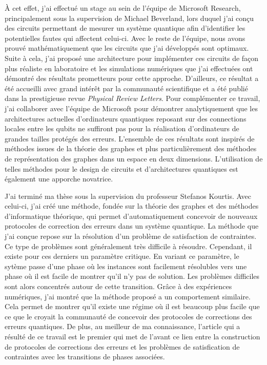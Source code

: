 À cet effet, j'ai effectué un stage au sein de l'équipe de Microsoft Research,
principalement sous la supervision de Michael Beverland, lors duquel j'ai conçu
des circuits permettant de mesurer un système quantique afin d'identifier les
potentielles fautes qui affectent celui-ci. 
Avec le reste de l'équipe, nous avons prouvé mathématiquement
que les circuits que j'ai développés sont optimaux.
Suite à cela, j'ai proposé une architecture pour implémenter ces circuits
de façon plus réaliste en laboratoire
et les simulations numériques que j'ai effectuées ont démontré des résultats 
prometteurs pour cette approche. 
D'ailleurs, ce résultat a été accueilli avec grand intérêt par la communauté
scientifique et a été publié dans la prestigieuse revue \textit{Physical Review Letters}.
Pour complémenter ce travail,
j'ai collaborer avec l'équipe de Microsoft pour démontrer analytiquement 
que les architectures actuelles d'ordinateurs quantiques reposant sur des connections
locales entre les qubits ne suffiront pas pour la réalisation d'ordinateurs de grandes
tailles protégés des erreurs.
L'ensemble de ces résultats sont inspirés de méthodes issues de la théorie des graphes
et plus particulièrement des méthodes de représentation des graphes dans un espace en 
deux dimensions.
L'utilisation de telles méthodes pour le design de circuits et d'architectures quantiques
est également une apporche novatrice.

J'ai terminé ma thèse sous la supervision du professeur Stefanos Kourtis.
Avec celui-ci, j'ai créé une méthode, 
fondée sur la théorie des graphes et des méthodes d'informatique théorique,
qui permet d'automatiquement concevoir de nouveaux protocoles de 
correction des erreurs dans un système quantique.
La méthode que j'ai conçue repose sur la résolution d'un problème 
de satisfaction de contraintes.
Ce type de problèmes sont généralement très difficile à résoudre.
Cependant,
il existe pour ces derniers un paramètre critique. 
En variant ce paramètre, 
le sytème passe d'une phase où les instances sont facilement résolubles 
vers une phase où il est facile de montrer qu'il n'y pas de solution.
Les problèmes difficiles sont alors concentrés autour de cette transition.
Grâce à des expériences numériques,
j'ai montré que la méthode proposé a un comportement similaire.
Cela permet de montrer qu'il existe une régime où il est beaucoup plus facile 
que ce que le croyait la communauté de concevoir des protocoles de corrections
des erreurs quantiques.
De plus,
au meilleur de ma connaissance,
l'article qui a résulté de ce travail est le premier qui met de l'avant
ce lien entre la construction de protocoles de corrections des erreurs
et les problèmes de satisfication de contraintes avec les transitions de phases
associées.

